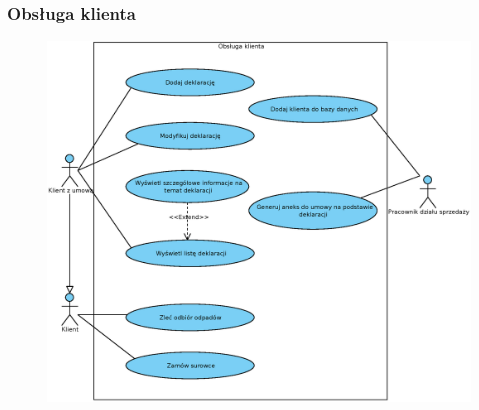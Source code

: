 

\subsubsection{Obsługa klienta}

	\begin{figure}[H]
		\centering
		\includegraphics[width=1.1\textwidth]{img/UC/deklaracje.eps}
	\end{figure}

